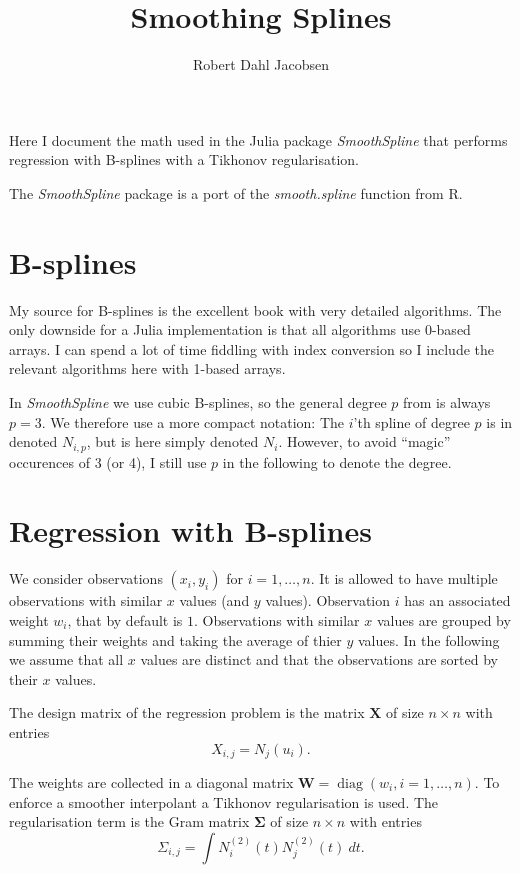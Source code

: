 \documentclass[a4paper]{scrartcl}
\title{Smoothing Splines}
\author{Robert Dahl Jacobsen}
\newcommand{\mat}[1]{\ensuremath{\bm{#1}}}
\newcommand\dd{\ensuremath{\:d}}
\DeclareMathOperator\diag{diag}
\begin{document}
\maketitle

Here I document the math used in the Julia package \textit{SmoothSpline} that performs regression with B-splines with a Tikhonov regularisation.

The \textit{SmoothSpline} package is a port of the \textit{smooth.spline} function from R.


\section{B-splines}
\label{sec:bsplines}

My source for B-splines is the excellent book \cite{Piegl:Tiller:1997} with very detailed algorithms.
The only downside for a Julia implementation is that all algorithms use 0-based arrays.
I can spend a lot of time fiddling with index conversion so I include the relevant algorithms here with 1-based arrays.

In \textit{SmoothSpline} we use cubic B-splines, so the general degree $p$ from \cite{Piegl:Tiller:1997} is always $p = 3$.
We therefore use a more compact notation:
The $i$'th spline of degree $p$ is in \cite{Piegl:Tiller:1997} denoted $N_{i,p}$, but is here simply denoted $N_i$.
However, to avoid \enquote{magic} occurences of 3 (or 4), I still use $p$ in the following to denote the degree.


\section{Regression with B-splines}
\label{sec:regression}

We consider observations $(x_i, y_i)$ for $i = 1, \ldots, n$. 
It is allowed to have multiple observations with similar $x$ values (and $y$ values).
Observation $i$ has an associated weight $w_i$, that by default is $1$.
Observations with similar $x$ values are grouped by summing their weights and taking the average of thier $y$ values.
In the following we assume that all $x$ values are distinct and that the observations are sorted by their $x$ values.

The design matrix of the regression problem is the matrix $\mat X$ of size $n\times n$ with entries
\begin{equation*}
    X_{i,j} = N_j(u_i).
\end{equation*}

The weights are collected in a diagonal matrix $\mat W = \diag(w_i, i = 1, \ldots, n)$.
To enforce a smoother interpolant a Tikhonov regularisation is used.
The regularisation term is the Gram matrix $\mat\Sigma$ of size $n\times n$ with entries
\begin{equation*}
    \Sigma_{i,j} =
    \int N_i^{(2)}(t) N_j^{(2)}(t) \dd t.
\end{equation*}
\end{document}

